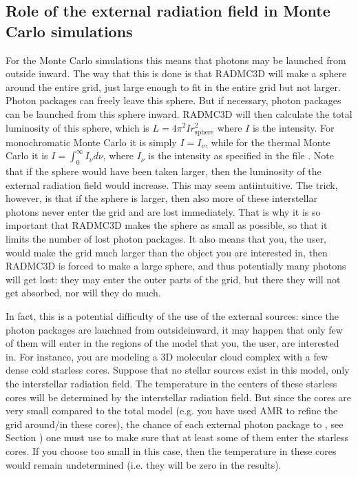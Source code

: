\documentclass[letterpaper,10pt,english]{sphinxmanual}
\begin{document}
\subsection{Role of the external radiation field in Monte Carlo simulations}
\label{\detokenize{stars:role-of-the-external-radiation-field-in-monte-carlo-simulations}}
For the Monte Carlo simulations this means that photons may be launched from
outside inward. The way that this is done is that RADMC\sphinxhyphen{}3D will make a
sphere around the entire grid, just large enough to fit in the entire grid
but not larger. Photon packages can freely leave this sphere. But if
necessary, photon packages can be launched from this sphere inward.
RADMC\sphinxhyphen{}3D will then calculate the total luminosity of this sphere, which is
\(L=4\pi^2 I r_{\mathrm{sphere}}^2\) where \(I\) is the intensity. For
monochromatic Monte Carlo it is simply \(I=I_\nu\), while for the thermal
Monte Carlo it is \(I=\int_0^\infty I_\nu d\nu\), where \(I_\nu\) is the
intensity as specified in the file .  Note
that if the sphere would have been taken larger, then the luminosity of the
external radiation field would increase. This may seem anti\sphinxhyphen{}intuitive. The
trick, however, is that if the sphere is larger, then also more of these
interstellar photons never enter the grid and are lost immediately. That is
why it is so important that RADMC\sphinxhyphen{}3D makes the sphere as small as possible,
so that it limits the number of lost photon packages. It also means that you,
the user, would make the grid much larger than the object you are interested
in, then RADMC\sphinxhyphen{}3D is forced to make a large sphere, and thus potentially
many photons will get lost: they may enter the outer parts of the grid, but
there they will not get absorbed, nor will they do much.

In fact, this is a potential difficulty of the use of the external sources:
since the photon packages are lauchned from outside\sphinxhyphen{}inward, it may happen that
only few of them will enter in the regions of the model that you, the user, are
interested in. For instance, you are modeling a 3\sphinxhyphen{}D molecular cloud complex with
a few dense cold starless cores. Suppose that no stellar sources exist in this
model, only the interstellar radiation field. The temperature in the centers of
these starless cores will be determined by the interstellar radiation field. But
since the cores are very small compared to the total model (e.g. you have used
AMR to refine the grid around/in these cores), the chance of each external
photon package to ,
see Section {\hyperref[\detokenize{dustradtrans:sec-dust-thermal-monte-carlo}]{}}) one must use to make sure that
at least some of them enter the starless cores. If you choose  too small
in this case, then the temperature in these cores would remain undetermined
(i.e. they will be zero in the results).
\end{document}
